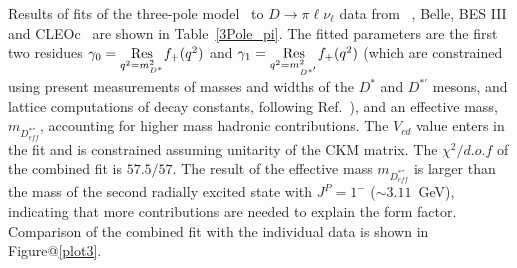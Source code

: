 \vspace{0.5cm}
Results of fits of the three-pole model~\cite{Becirevic:2014kaa} to  $D \to \pi \ell \nu_\ell $ data from \babar~\cite{babar-new}, Belle\cite{Widhalm:2006wz}, BES III\cite{BESIII-new} and 
CLEOc~\cite{Besson:2009uv,Dobbs:2007aa} are shown in Table~\ref{3Pole_pi}. 
The fitted parameters are the first two residues $\gamma_{0}=\underset{ q^2=m_{D^{\ast}}^2} {\rm Res} f_+(q^2) $ 
and $\gamma_{1}=\underset{q^2=m_{D^{\ast '}}^2}{\rm Res} f_+(q^2)$ (which are constrained using present measurements 
of masses and widths of the $D^\ast$ and $D^{\ast '}$ mesons, and lattice computations of decay constants, following Ref.~\cite{Becirevic:2014kaa}), 
and an effective mass, $m_{D^{\ast ''}_{eff}}$, accounting for higher mass hadronic contributions.
The $V_{cd}$ value enters in the fit and is constrained assuming unitarity of the CKM matrix.
The $\chi^2/d.o.f$ of the combined fit is $57.5/57$. The result of the effective mass $m_{D^{\ast ''}_{eff}}$ is larger than the mass of the 
second radially excited state with $J^P = 1^{-}$ ($\sim 3.11$~GeV), indicating that more contributions are needed to explain the form factor. 
Comparison of the combined fit with the individual data is shown in Figure@\ref{plot3}.

